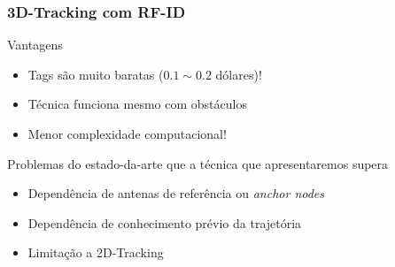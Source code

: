 \begin{frame}
  \frametitle{3D-Tracking com RF-ID}

  Vantagens
  \begin{itemize}
    \item  \alert{Tags são muito baratas} ($0.1 \sim 0.2$ dólares)!
    \item  Técnica \alert{funciona mesmo com obstáculos}
    \item  \alert{Menor complexidade computacional}!
  \end{itemize}

  Problemas do estado-da-arte que a técnica que apresentaremos supera
  \begin{itemize}
    \item  Dependência de antenas de referência ou \emph{anchor nodes} 
    \item  Dependência de conhecimento prévio da trajetória
    \item  Limitação a 2D-Tracking
  \end{itemize}
\end{frame}
